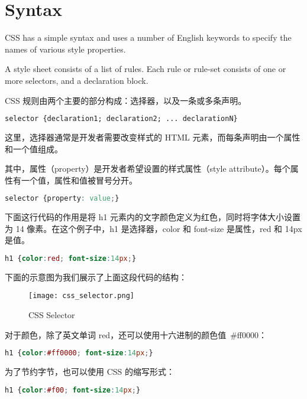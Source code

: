 \chapter{Syntax}

CSS has a simple syntax and uses a number of English keywords to specify the names of various style properties.

A style sheet consists of a list of rules. Each rule or rule-set consists of one or more selectors, and a declaration block.

CSS 规则由两个主要的部分构成：选择器，以及一条或多条声明。

\begin{lstlisting}[language=CSS]
selector {declaration1; declaration2; ... declarationN}
\end{lstlisting}

这里，选择器通常是开发者需要改变样式的 HTML 元素，而每条声明由一个属性和一个值组成。

其中，属性（property）是开发者希望设置的样式属性（style attribute）。每个属性有一个值，属性和值被冒号分开。

\begin{lstlisting}[language=CSS]
selector {property: value;}
\end{lstlisting}

下面这行代码的作用是将 h1 元素内的文字颜色定义为红色，同时将字体大小设置为 14 像素。在这个例子中，h1 是选择器，color 和 font-size 是属性，red 和 14px 是值。

\begin{lstlisting}[language=CSS]
h1 {color:red; font-size:14px;}
\end{lstlisting}

下面的示意图为我们展示了上面这段代码的结构：

\begin{figure}[!h]
\centering
\texttt{[image: css\_selector.png]}
\caption{CSS Selector}
\label{css_selector}
\end{figure}

对于颜色，除了英文单词 red，还可以使用十六进制的颜色值~\#ff0000：

\begin{lstlisting}[language=CSS]
h1 {color:#ff0000; font-size:14px;}
\end{lstlisting}

为了节约字节，也可以使用 CSS 的缩写形式：

\begin{lstlisting}[language=CSS]
h1 {color:#f00; font-size:14px;}
\end{lstlisting}

